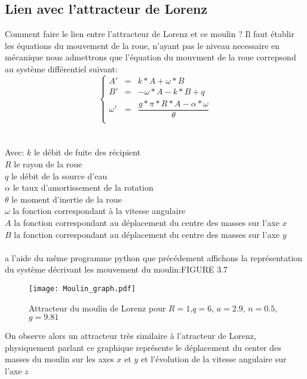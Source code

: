 \subsection{Lien avec l'attracteur de Lorenz}
Comment faire le lien entre l'attracteur de Lorenz et ce moulin ? Il faut établir les équations du mouvement de la roue, n'ayant pas le niveau necessaire en mécanique nous admettrons que l'équation du mouvment de la roue correpsond au système différentiel suivant:\\
\[
    \left\{
    \begin{array}{rcl}
        A'&=&k*A+\omega*B\\
        B'&=&-\omega*A-k*B+q\\
        \omega'&=&\dfrac{g*\pi*R*A-\alpha*\omega}{\theta }\\
    \end{array}
    \right.
\]\\\\
Avec: $k$ le débit de fuite des récipient\\
$R$ le rayon de la roue\\
$q$ le débit de la source d'eau\\
$\alpha$ le taux d'amortissement de la rotation\\
$\theta$ le moment d'inertie de la roue\\
$\omega$ la fonction correspondant à la vitesse angulaire\\
$A$ la fonction correspondant au déplacement du centre des masses sur l'axe $x$\\
$B$ la fonction correspondant au déplacement du centre des masses sur l'axe $y$\\\\

a l'aide du même programme python que précédement affichons la représentation du système décrivant les mouvement du moulin:FIGURE 3.7

\begin{figure}
    \texttt{[image: Moulin\_graph.pdf]}
    \caption{Attracteur du moulin de Lorenz pour $R=1$,$q=6$, $a=2.9$, $n=0.5$, $g=9.81$ } 
\end{figure}

On observe alors un attracteur très similaire à l'atracteur de Lorenz, physiquement parlant ce graphique représente le déplacement du center des masses du moulin sur les axes $x$ et $y$ et l'évolution de la vitesse angulaire sur l'axe $z$\\

